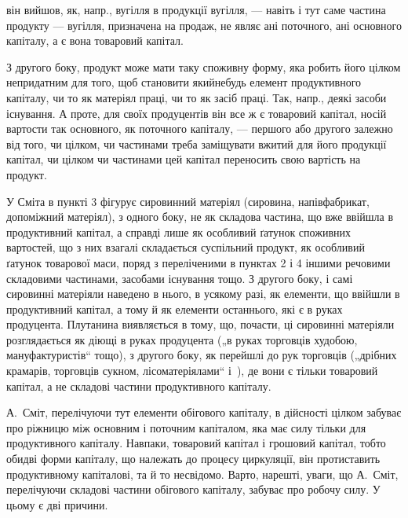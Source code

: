\parcont{}  %
він вийшов, як, напр., вугілля в продукції вугілля, — навіть і тут саме
частина продукту — вугілля, призначена на продаж, не являє ані поточного,
ані основного капіталу, а є вона товаровий капітал.

З другого боку, продукт може мати таку споживну форму, яка робить
його цілком непридатним для того, щоб становити якийнебудь елемент
продуктивного капіталу, чи то як матеріял праці, чи то як засіб
праці. Так, напр., деякі засоби існування. А проте, для своїх продуцентів
він все ж є товаровий капітал, носій вартости так основного, як поточного
капіталу, — першого або другого залежно від того, чи цілком,
чи частинами треба заміщувати вжитий для його продукції капітал, чи
цілком чи частинами цей капітал переносить свою вартість на продукт.

У Сміта в пункті 3 фігурує сировинний матеріял (сировина, напівфабрикат,
допоміжний матеріял), з одного боку, не як складова частина,
що вже ввійшла в продуктивний капітал, а справді лише як особливий ґатунок
споживних вартостей, що з них взагалі складається суспільний
продукт, як особливий ґатунок товарової маси, поряд з переліченими в
пунктах 2 і 4 іншими речовими складовими частинами, засобами існування
тощо. З другого боку, і самі сировинні матеріяли наведено в нього, в
усякому разі, як елементи, що ввійшли в продуктивний капітал, а тому й
як елементи останнього, які є в руках продуцента. Плутанина виявляється в
тому, що, почасти, ці сировинні матеріяли розглядається як діющі в руках
продуцента („в руках торговців худобою, мануфактуристів“ тощо), з
другого боку, як перейшлі до рук торговців („дрібних крамарів, торговців
сукном, лісоматеріялами“ і~), де вони є тільки товаровий капітал, а
не складові частини продуктивного капіталу.

А.~Сміт, перелічуючи тут елементи обігового капіталу, в дійсності цілком
забуває про ріжницю між основним і поточним капіталом, яка має
силу тільки для продуктивного капіталу. Навпаки, товаровий капітал і
грошовий капітал, тобто обидві форми капіталу, що належать до процесу
циркуляції, він протиставить продуктивному капіталові, та й то несвідомо.
Варто, нарешті, уваги, що А.~Сміт, перелічуючи складові частини обігового
капіталу, забуває про робочу силу. У цьому є дві причини.

